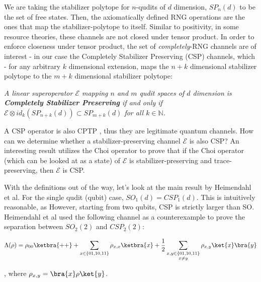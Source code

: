 We are taking the stabilizer polytope for $n$-qudits of $d$ dimension, $SP_n(d)$ to be the set of free states. Then, the axiomatically defined RNG operations are the ones that map the stabilizer-polytope to itself. Similar to positivity, in some resource theories, these channels are not closed under tensor product. In order to enforce closeness under tensor product, the set of \textit{completely}-RNG channels are of interest - in our case the Completely Stabilizer Preserving (CSP) channels, which - for any arbitrary $k$ dimensional extension, maps the $n+k$ dimensional stabilizer polytope to the $m+k$ dimensional stabilizer polytope: 

\begin{definition}
\textit{A linear superoperator $\mathcal{E}$ mapping $n$ and $m$ qudit spaces of $d$ dimension is \textbf{Completely Stabilizer Preserving} if and only if $\mathcal{E} \otimes id_k (SP_{n+k}(d)) \subset SP_{m+k}(d)$ for all $k \in \mathbb{N}$.  }
\end{definition}

A CSP operator is also CPTP \cite{heimendahl_axiomatic_2022}, thus they are legitimate quantum channels. How can we determine whether a stabilizer-preserving channel $\mathcal{E}$ is also CSP? An interesting result \cite{seddon_quantifying_2019} utilizes the Choi operator to prove that if the Choi operator (which can be looked at as a state) of $\mathcal{E}$ is stabilizer-preserving and trace-preserving, then $\mathcal{E}$ is CSP. 

With the definitions out of the way, let's look at the main result by Heimendahl et al. For the single qudit (qubit) case, $SO_1(d)= CSP_1(d)$. This is intuitively reasonable, as  However, starting from two qubits, CSP is strictly larger than SO. Heimendahl et al used the following channel as a counterexample to prove the separation between $SO_2(2)$ and $CSP_2(2)$: 

\begin{align}
\Lambda(\rho) = \rho_{00} \ketbra{++} + \sum_{x \in \{01, 10, 11\}} \rho_{x,x} \ketbra{x} + \frac{1}{2} \sum_{\substack{x,y \in \{01, 10, 11\} \\ x\neq y}} \rho_{x,y}\ket{x}\bra{y}
\end{align}

, where $\rho_{x,y}=\bra{x} \rho \ket{y}$. 


